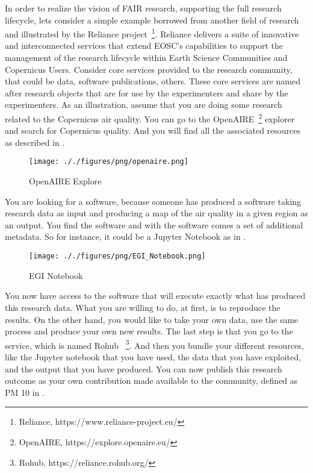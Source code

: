 In order to realize the vision of FAIR research, supporting the full research lifecycle, lets consider a simple example borrowed from another field of research and illustrated by the Reliance project~\footnote{Reliance, https://www.reliance-project.eu/}. Reliance delivers a suite of innovative and interconnected services that extend EOSC’s capabilities to support the management of the research lifecycle within Earth Science Communities and Copernicus Users. Consider core services provided to the research community, that could be data, software publications, others. These core services are named after research objects that are for use by the experimenters and share by the experimenters. As an illustration, assume that you are doing some research related to the Copernicus air quality. You can go to the OpenAIRE~\footnote{OpenAIRE, https://explore.openaire.eu/} explorer and search for Copernicus quality. And you will find all the associated resources as described in . 
\begin{figure*}[t]
    \centering
    \texttt{[image: ././figures/png/openaire.png]}
	\caption{OpenAIRE Explore}
	\label{fig:OpenAIRE-EXPLORE}
\end{figure*}
You are looking for a software, because someone has produced a software taking research data as input and producing a map of the air quality in a given region as an output. You find the software and with the software comes a set of additional metadata. So for instance, it could be a Jupyter Notebook as in .
\begin{figure*}[t]
    \centering
    \texttt{[image: ././figures/png/EGI\_Notebook.png]}
	\caption{EGI Notebook}
	\label{fig:EGI-Notebook}
\end{figure*}
You now have access to the software that will execute exactly what has produced this research data. What you are willing to do, at first, is to reproduce the results. On the other hand, you would like to take your own data, use the same process and produce your own new results. The last step is that you go to the service, which is named Rohub ~\footnote{Rohub, https://reliance.rohub.org/}. And then you bundle your different resources, like the Jupyter notebook that you have used, the data that you have exploited, and the output that you have produced. You can now publish this research outcome as your own contribution made available to the community, defined as PM 10 in . 
